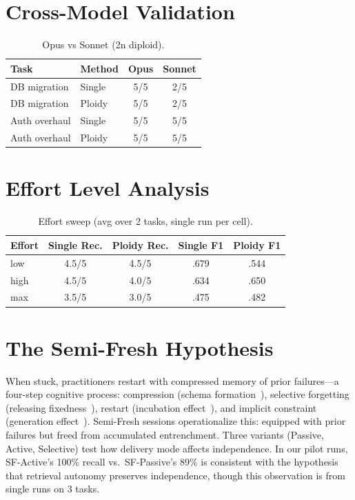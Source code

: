 \documentclass{article}
\begin{document}
\section{Cross-Model Validation}
\begin{table}[H]
\centering
\caption{Opus vs Sonnet (2n diploid).}
\small
\begin{tabular}{@{}llcc@{}}
\toprule
\textbf{Task} & \textbf{Method} & \textbf{Opus} & \textbf{Sonnet} \\
\midrule
DB migration & Single & 5/5 & 2/5 \\
DB migration & Ploidy & 5/5 & 2/5 \\
Auth overhaul & Single & 5/5 & 5/5 \\
Auth overhaul & Ploidy & 5/5 & 5/5 \\
\bottomrule
\end{tabular}
\end{table}

\section{Effort Level Analysis}
\label{sec:effort-appendix}
\begin{table}[H]
\centering
\caption{Effort sweep (avg over 2 tasks, single run per cell).}
\small
\begin{tabular}{@{}lcccc@{}}
\toprule
\textbf{Effort} & \textbf{Single Rec.} & \textbf{Ploidy Rec.} & \textbf{Single F1} & \textbf{Ploidy F1} \\
\midrule
low & 4.5/5 & 4.5/5 & .679 & .544 \\
high & 4.5/5 & 4.0/5 & .634 & .650 \\
max & 3.5/5 & 3.0/5 & .475 & .482 \\
\bottomrule
\end{tabular}
\end{table}

\section{The Semi-Fresh Hypothesis}
\label{sec:semifresh-appendix}

When stuck, practitioners restart with compressed memory of prior failures---a four-step cognitive process: compression (schema formation~\citep{bartlett1932remembering}), selective forgetting (releasing fixedness~\citep{storm2012forgetting}), restart (incubation effect~\citep{sio2009incubation}), and implicit constraint (generation effect~\citep{slamecka1978generation}). Semi-Fresh sessions operationalize this: equipped with prior failures but freed from accumulated entrenchment. Three variants (Passive, Active, Selective) test how delivery mode affects independence. In our pilot runs, SF-Active's 100\% recall vs.\ SF-Passive's 89\% is consistent with the hypothesis that retrieval autonomy preserves independence, though this observation is from single runs on 3 tasks.
\end{document}
